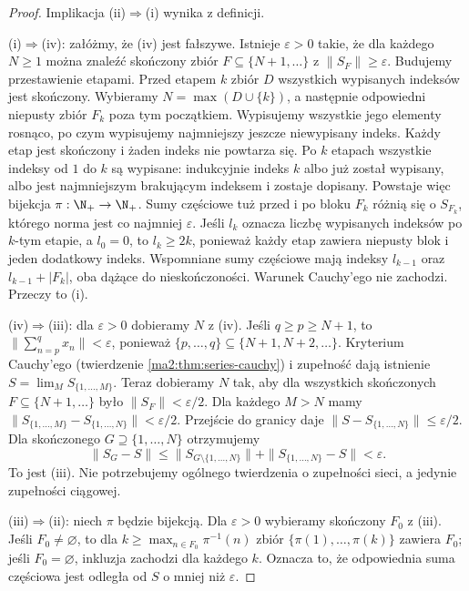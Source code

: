 \begin{proof}
Implikacja (ii)$\Rightarrow$(i) wynika z definicji.

(i)$\Rightarrow$(iv): załóżmy, że (iv) jest fałszywe.
Istnieje $\varepsilon>0$ takie, że dla każdego $N\ge1$
można znaleźć skończony zbiór $F\subseteq\{N+1,\ldots\}$
z $\|S_F\|\ge\varepsilon$. Budujemy przestawienie etapami.
Przed etapem $k$ zbiór $D$ wszystkich wypisanych indeksów
jest skończony. Wybieramy $N=\max(D\cup\{k\})$,
a następnie odpowiedni niepusty zbiór $F_k$ poza tym
początkiem. Wypisujemy wszystkie jego elementy rosnąco,
po czym wypisujemy najmniejszy jeszcze niewypisany indeks.
Każdy etap jest skończony i żaden indeks nie powtarza się.
Po $k$ etapach wszystkie indeksy od $1$ do $k$ są wypisane:
indukcyjnie indeks $k$ albo już został wypisany, albo
jest najmniejszym brakującym indeksem i zostaje dopisany.
Powstaje więc bijekcja $\pi:\N_+\to\N_+$.
Sumy częściowe tuż przed i po bloku $F_k$ różnią się
o $S_{F_k}$, którego norma jest co najmniej $\varepsilon$.
Jeśli $l_k$ oznacza liczbę wypisanych indeksów po
$k$-tym etapie, a $l_0=0$, to $l_k\ge2k$, ponieważ
każdy etap zawiera niepusty blok i jeden dodatkowy indeks.
Wspomniane sumy częściowe mają indeksy $l_{k-1}$ oraz
$l_{k-1}+|F_k|$, oba dążące do nieskończoności.
Warunek Cauchy'ego nie zachodzi.
Przeczy to (i).

(iv)$\Rightarrow$(iii): dla $\varepsilon>0$ dobieramy $N$
z (iv). Jeśli $q\ge p\ge N+1$, to
$\|\sum_{n=p}^q x_n\|<\varepsilon$, ponieważ
$\{p,\ldots,q\}\subseteq\{N+1,N+2,\ldots\}$. Kryterium Cauchy'ego
(twierdzenie \ref{ma2:thm:series-cauchy}) i zupełność
dają istnienie $S=\lim_M S_{\{1,\ldots,M\}}$.
Teraz dobieramy $N$ tak, aby dla wszystkich skończonych
$F\subseteq\{N+1,\ldots\}$ było $\|S_F\|<\varepsilon/2$.
Dla każdego $M>N$ mamy
$\|S_{\{1,\ldots,M\}}-S_{\{1,\ldots,N\}}\|<\varepsilon/2$.
Przejście do granicy daje
$\|S-S_{\{1,\ldots,N\}}\|\le\varepsilon/2$.
Dla skończonego $G\supseteq\{1,\ldots,N\}$ otrzymujemy
\[
 \|S_G-S\|\le\|S_{G\setminus\{1,\ldots,N\}}\|
   +\|S_{\{1,\ldots,N\}}-S\|<\varepsilon.
\]
To jest (iii). Nie potrzebujemy ogólnego twierdzenia
o zupełności sieci, a jedynie zupełności ciągowej.

(iii)$\Rightarrow$(ii): niech $\pi$ będzie bijekcją.
Dla $\varepsilon>0$ wybieramy skończony $F_0$ z (iii).
Jeśli $F_0\ne\varnothing$, to dla
$k\ge\max_{n\in F_0}\pi^{-1}(n)$ zbiór
$\{\pi(1),\ldots,\pi(k)\}$ zawiera $F_0$; jeśli
$F_0=\varnothing$, inkluzja zachodzi dla każdego $k$.
Oznacza to, że odpowiednia suma częściowa jest odległa
od $S$ o mniej niż $\varepsilon$.


\end{proof}
